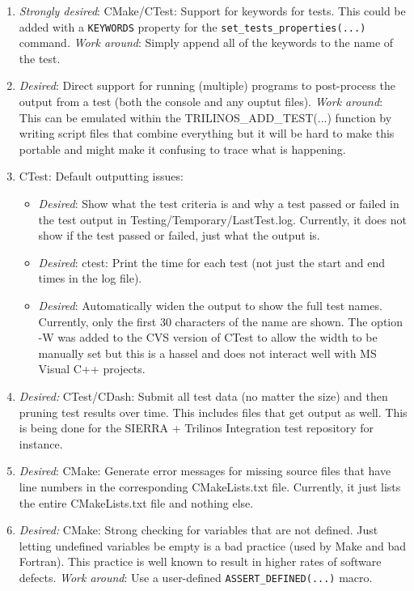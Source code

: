 \documentclass[pdf,ps2pdf,11pt]{SANDreport}
\begin{document}
\begin{enumerate}

{}\item\textit{Strongly desired}: CMake/CTest: Support for keywords
for tests.  This could be added with a {}\texttt{KEYWORDS} property
for the {}\texttt{set\_tests\_properties(...)} command.
{}\textit{Work around}: Simply append all of the keywords to the name
of the test.

{}\item\textit{Desired}: Direct support for running (multiple)
programs to post-process the output from a test (both the console and
any ouptut files).  {}\textit{Work around}: This can be emulated
within the TRILINOS\_ADD\_TEST(...) function by writing script files
that combine everything but it will be hard to make this portable and
might make it confusing to trace what is happening.

{}\item CTest: Default outputting issues:

  \begin{itemize}

  {}\item\textit{Desired}: Show what the test criteria is and why a
  test passed or failed in the test output in
  Testing/Temporary/LastTest.log.  Currently, it does not show if the
  test passed or failed, just what the output is.
  
  {}\item\textit{Desired}: ctest: Print the time for each test (not
  just the start and end times in the log file).

  {}\item\textit{Desired}: Automatically widen the output to show the
  full test names.  Currently, only the first 30 characters of the
  name are shown.  The option -W was added to the CVS version of CTest
  to allow the width to be manually set but this is a hassel and does
  not interact well with MS Visual C++ projects.

  \end{itemize}

{}\item\textit{Desired:} CTest/CDash: Submit all test data (no matter
the size) and then pruning test results over time.  This includes
files that get output as well.  This is being done for the SIERRA +
Trilinos Integration test repository for instance.

{}\item\textit{Desired}: CMake: Generate error messages for missing
source files that have line numbers in the corresponding
CMakeLists.txt file.  Currently, it just lists the entire
CMakeLists.txt file and nothing else.

{}\item\textit{Desired:} CMake: Strong checking for variables that are
not defined.  Just letting undefined variables be empty is a bad
practice (used by Make and bad Fortran).  This practice is well known
to result in higher rates of software defects.  {}\textit{Work
around}: Use a user-defined {}\texttt{ASSERT\_DEFINED(...)} macro.

\end{enumerate}
\end{document}
